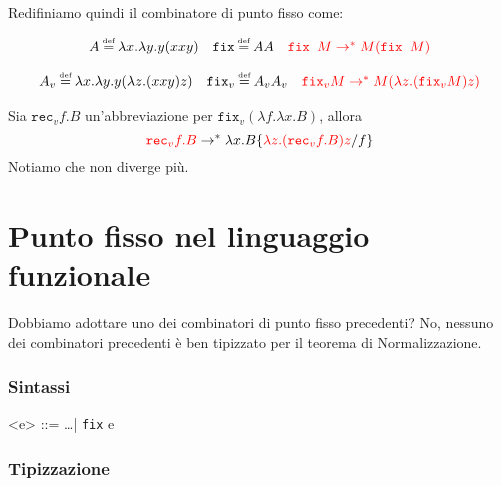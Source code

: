 Redifiniamo quindi il combinatore di punto fisso come:
\begin{tcolorbox}[title = Call-by-name fixed-point combinator]
    \[
      \begin{array}{lll}
        A \defeq \lambda x. \lambda y. y(xxy) & \texttt{fix} \defeq AA 
        & \textcolor{red}{\texttt{fix }M \rightarrow^* M(\texttt{fix }M)}\\
      \end{array}  
    \]
\end{tcolorbox}
\begin{tcolorbox}[title = Call-by-value fixed-point combinator]
    \[
      \begin{array}{lll}
        A_v \defeq \lambda x. \lambda y. y(\lambda z .(xxy)z) & \texttt{fix}_v \defeq A_vA_v 
        & \textcolor{red}{\texttt{fix}_vM \rightarrow^* M(\lambda z.(\texttt{fix}_vM)z)}\\
      \end{array}  
    \]
\end{tcolorbox}
\begin{tcolorbox}[title = Call-by-value nelle funzioni ricorsive]
Sia $\texttt{rec}_v f.B$ un'abbreviazione per $\texttt{fix}_v(\lambda f.\lambda x.B)$, allora
\[
  \textcolor{red}{\texttt{rec}_v f.B} \rightarrow^* \lambda x.B\{
    \textcolor{red}{\lambda z .(\texttt{rec}_v f.B)z}/f\}  
\]
Notiamo che non diverge più.
\end{tcolorbox}
\section{Punto fisso nel linguaggio funzionale}
Dobbiamo adottare uno dei combinatori di punto fisso precedenti? No, nessuno dei combinatori
precedenti è ben tipizzato per il teorema di Normalizzazione.
\subsubsection{Sintassi}
\begin{grammar}
    <e> ::= \dots | \texttt{fix} e
\end{grammar}
\subsubsection{Tipizzazione}
\begin{prooftree}
\end{prooftree}
